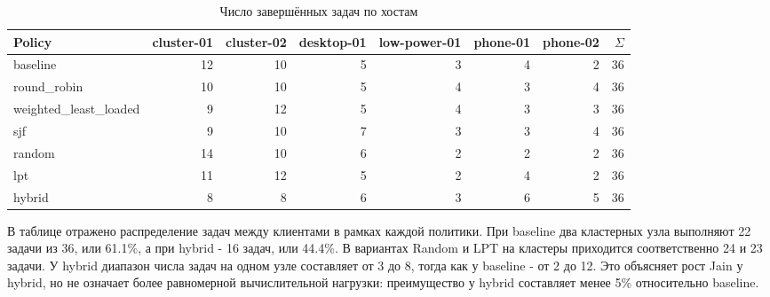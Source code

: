 \documentclass[a4paper,12pt]{extarticle}
\begin{document}
\begin{table}[H]
\centering
    \caption{Число завершённых задач по хостам}
    \scriptsize
    \begin{tabular}{lrrrrrrr}
\toprule
        Policy & cluster-01 & cluster-02 & desktop-01 & low-power-01 & phone-01 & phone-02 & $\Sigma$ \\
\midrule
    baseline & 12 & 10 & 5 & 3 & 4 & 2 & 36 \\
    round\_robin & 10 & 10 & 5 & 4 & 3 & 4 & 36 \\
    weighted\_least\_loaded & 9 & 12 & 5 & 4 & 3 & 3 & 36 \\
    sjf & 9 & 10 & 7 & 3 & 3 & 4 & 36 \\
    random & 14 & 10 & 6 & 2 & 2 & 2 & 36 \\
    lpt & 11 & 12 & 5 & 2 & 4 & 2 & 36 \\
    hybrid & 8 & 8 & 6 & 3 & 6 & 5 & 36 \\
\bottomrule
\end{tabular}
\end{table}

В таблице отражено распределение задач между клиентами в рамках каждой политики. При baseline два кластерных узла выполняют 22 задачи из 36, или 61.1\%, а при hybrid - 16 задач, или 44.4\%. В вариантах Random и LPT на кластеры приходится соответственно 24 и 23 задачи. У hybrid диапазон числа задач на одном узле составляет от 3 до 8, тогда как у baseline - от 2 до 12. Это объясняет рост Jain у hybrid, но не означает более равномерной вычислительной нагрузки: преимущество у hybrid составляет менее 5\% относительно baseline.
\end{document}
